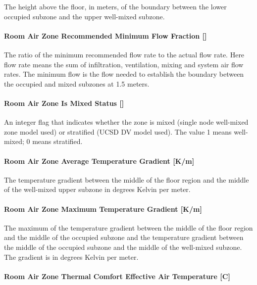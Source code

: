 The height above the floor, in meters, of the boundary between the lower occupied subzone and the upper well-mixed subzone.

\paragraph{Room Air Zone Recommended Minimum Flow Fraction {[]}}\label{room-air-zone-recommended-minimum-flow-fraction}

The ratio of the minimum recommended flow rate to the actual flow rate. Here flow rate means the sum of infiltration, ventilation, mixing and system air flow rates. The minimum flow is the flow needed to establish the boundary between the occupied and mixed subzones at 1.5 meters.

\paragraph{Room Air Zone Is Mixed Status {[]}}\label{room-air-zone-is-mixed-status}

An integer flag that indicates whether the zone is mixed (single node well-mixed zone model used) or stratified (UCSD DV model used). The value 1 means well-mixed; 0 means stratified.

\paragraph{Room Air Zone Average Temperature Gradient {[}K/m{]}}\label{room-air-zone-average-temperature-gradient-km}

The temperature gradient between the middle of the floor region and the middle of the well-mixed upper subzone in degrees Kelvin per meter.

\paragraph{Room Air Zone Maximum Temperature Gradient {[}K/m{]}}\label{room-air-zone-maximum-temperature-gradient-km}

The maximum of the temperature gradient between the middle of the floor region and the middle of the occupied subzone and the temperature gradient between the middle of the occupied subzone and the middle of the well-mixed subzone. The gradient is in degrees Kelvin per meter.

\paragraph{Room Air Zone Thermal Comfort Effective Air Temperature {[}C{]}}\label{room-air-zone-thermal-comfort-effective-air-temperature-c}

